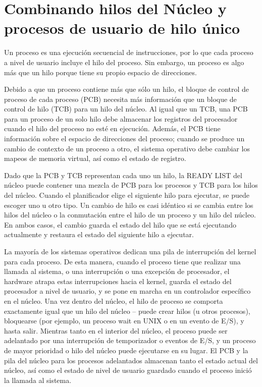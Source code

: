 \documentclass[10pt]{book}
\begin{document}
\section{Combinando hilos del Núcleo y procesos de usuario de hilo único}
Un proceso es una ejecución secuencial de instrucciones, por lo que cada proceso a nivel de usuario incluye el hilo del proceso. Sin embargo, un proceso es algo más que un hilo porque tiene su propio espacio de direcciones.

Debido a que un proceso contiene más que sólo un hilo, el bloque de control de proceso de cada proceso (PCB) necesita más información que un bloque de control de hilo (TCB) para un hilo del núcleo. Al igual que un TCB, una PCB para un proceso de un solo hilo debe almacenar los registros del procesador cuando el hilo del proceso no esté en ejecución. Además, el PCB tiene información sobre el espacio de direcciones del proceso; cuando se produce un cambio de contexto de un proceso a otro, el sistema operativo debe cambiar los mapeos de memoria virtual, así como el estado de registro.

Dado que la PCB y TCB representan cada uno un hilo, la READY LIST del núcleo puede contener una mezcla de PCB para los procesos y TCB para los hilos del núcleo. Cuando el planificador elige el siguiente hilo para ejecutar, se puede escoger uno u otro tipo. Un cambio de hilo es casi idéntico si se cambia entre los hilos del núcleo o la conmutación entre el hilo de un proceso y un hilo del núcleo. En ambos casos, el cambio guarda el estado del hilo que se está ejecutando actualmente y restaura el estado del siguiente hilo a ejecutar.

La mayoría de los sistemas operativos dedican una pila de interrupción del kernel para cada proceso. De esta manera, cuando el proceso tiene que realizar una llamada al sistema, o una interrupción o una excepción de procesador, el hardware atrapa estas interrupciones hacia el kernel, guarda el estado del procesador a nivel de usuario, y se pone en marcha en un controlador específico en el núcleo. Una vez dentro del núcleo, el hilo de proceso se comporta exactamente igual que un hilo del núcleo -- puede crear hilos (u otros procesos), bloquearse (por ejemplo, un proceso {\mf wait} en UNIX o en un evento de E/S), y hasta salir. Mientras tanto en el interior del núcleo, el proceso puede ser adelantado por una interrupción de temporizador o eventos de E/S, y un proceso de mayor prioridad o hilo del núcleo puede ejecutarse en su lugar. El PCB y la pila del núcleo para los procesos adelantados almacenan tanto el estado actual del núcleo, así como el estado de nivel de usuario guardado cuando el proceso inició la llamada al sistema.
\end{document}
